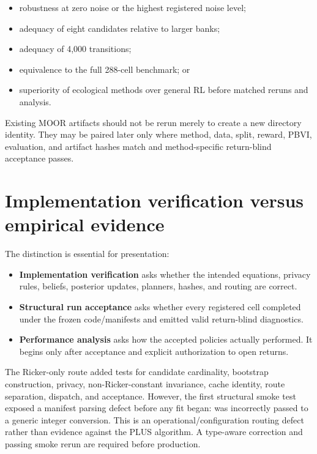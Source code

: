 \documentclass[11pt]{article}
\newcommand{\code}[1]{\texttt{\detokenize{#1}}}
\begin{document}
\begin{itemize}
  \item robustness at zero noise or the highest registered noise level;
  \item adequacy of eight candidates relative to larger banks;
  \item adequacy of 4,000 transitions;
  \item equivalence to the full 288-cell benchmark; or
  \item superiority of ecological methods over general RL before matched reruns and analysis.
\end{itemize}

Existing MOOR artifacts should not be rerun merely to create a new directory identity. They may be
paired later only where method, data, split, reward, PBVI, evaluation, and artifact hashes match and
method-specific return-blind acceptance passes.

\section{Implementation verification versus empirical evidence}

The distinction is essential for presentation:

\begin{itemize}
  \item \textbf{Implementation verification} asks whether the intended equations, privacy rules,
  beliefs, posterior updates, planners, hashes, and routing are correct.
  \item \textbf{Structural run acceptance} asks whether every registered cell completed under the
  frozen code/manifests and emitted valid return-blind diagnostics.
  \item \textbf{Performance analysis} asks how the accepted policies actually performed. It begins
  only after acceptance and explicit authorization to open returns.
\end{itemize}

The Ricker-only route added tests for candidate cardinality, bootstrap construction, privacy,
non-Ricker-constant invariance, cache identity, route separation, dispatch, and acceptance. However,
the first structural smoke test exposed a manifest parsing defect before any fit began:
\code{regime_path_count=not_applicable} was incorrectly passed to a generic integer conversion.
This is an operational/configuration routing defect rather than evidence against the PLUS
algorithm. A type-aware correction and passing smoke rerun are required before production.
\end{document}

